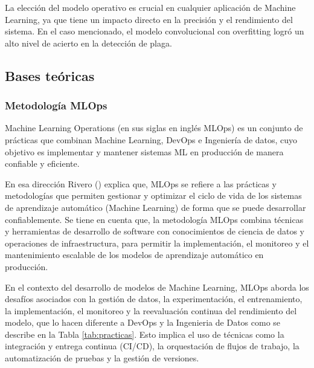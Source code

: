 La elección del modelo operativo es crucial en cualquier aplicación de Machine Learning, ya que tiene un impacto directo en la precisión y el rendimiento del sistema. En el caso mencionado, el modelo convolucional con overfitting logró un alto nivel de acierto en la detección de plaga.

\subsection{Bases teóricas}
\subsubsection{Metodología MLOps}

Machine Learning Operations (en sus siglas en inglés MLOps) es un conjunto de prácticas que combinan Machine Learning, DevOps e Ingeniería de datos, cuyo objetivo es implementar y mantener sistemas ML en producción de manera confiable y eficiente.
 
En esa dirección Rivero (\citeyear{rivero2022}) explica que, MLOps se refiere a las prácticas y metodologías que permiten gestionar y optimizar el ciclo de vida de los sistemas de aprendizaje automático (Machine Learning) de forma que se puede desarrollar confiablemente. Se tiene en cuenta que, la metodología MLOps combina técnicas y herramientas de desarrollo de software con conocimientos de ciencia de datos y operaciones de infraestructura, para permitir la implementación, el monitoreo y el mantenimiento escalable de los modelos de aprendizaje automático en producción.

En el contexto del desarrollo de modelos de Machine Learning, MLOps aborda los desafíos asociados con la gestión de datos, la experimentación, el entrenamiento, la implementación, el monitoreo y la reevaluación continua del rendimiento del modelo, que lo hacen diferente a DevOps y la Ingenieria de Datos como se describe en la Tabla \ref{tab:practicas}. Esto implica el uso de técnicas como la integración y entrega continua (CI/CD), la orquestación de flujos de trabajo, la automatización de pruebas y la gestión de versiones.

